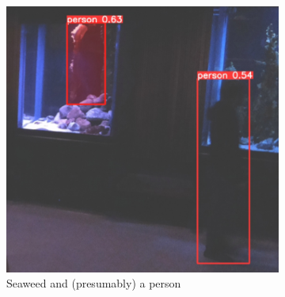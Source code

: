 \begin{figure}[H]
    \centering
    \begin{subfigure}{0.60\textwidth}
        \centering
        \includegraphics[width=\textwidth]{Images/Fun/seaweed-man-more-than-I.png}
        \caption{Seaweed and (presumably) a person}
    \end{subfigure}
    \hfill
    \begin{subfigure}{0.30\textwidth}
        \centering

\end{subfigure}
\end{figure}
